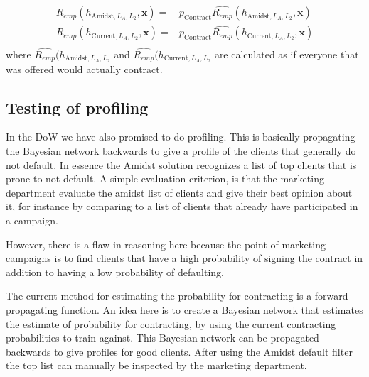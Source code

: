 \documentclass{article}
\theoremstyle{theorem}
\theoremstyle{definition}
\newcommand{\bv}[1]{\bm{#1}}
\begin{document}
\begin{equation}
\begin{split}
R_{emp}(h_{\mbox{Amidst},L_A,L_2}, \bv{x}) =& p_{\mbox{Contract}} \widehat{R_{emp}}(h_{\mbox{Amidst},L_A,L_2}, \bv{x})\\
R_{emp}(h_{\mbox{Current},L_A,L_2}, \bv{x}) =& p_{\mbox{Contract}} \widehat{R_{emp}}(h_{\mbox{Current},L_A,L_2}, \bv{x})\\
\end{split}
\end{equation}
where $\widehat{R_{emp}}(h_{\mbox{Amidst},L_A,L_2}$ and $\widehat{R_{emp}}(h_{\mbox{Current},L_A,L_2}$ are calculated as if everyone that was offered would actually contract.

\subsection*{Testing of profiling}

In the DoW we have also promised to do profiling. This is basically propagating the Bayesian network backwards to give a profile of the clients that generally do not default. In essence the Amidst solution recognizes a list of top clients that is prone to not default.  A simple evaluation criterion, is that the marketing department evaluate the amidst list of clients and give their best opinion about it, for instance by comparing to a list of clients that already have participated in a campaign.

However, there is a flaw in reasoning here because the point of marketing campaigns is to find clients that have a high probability of signing the contract in addition to having a low probability of defaulting.  

The current method for estimating the probability for contracting is a forward propagating function.  An idea here is to create a Bayesian network that estimates the estimate of probability for contracting, by using the current contracting probabilities to train against.  This Bayesian network can be propagated backwards to give profiles for good clients.  After using the Amidst default filter the top list can manually be inspected by the marketing department. 
\end{document}
